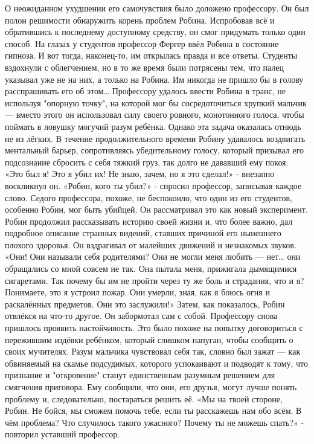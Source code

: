 \documentclass[a4paper,12pt]{book}
\begin{document}
	О неожиданном ухудшении его самочувствия было доложено профессору. Он был полон решимости обнаружить корень проблем Робина. Испробовав всё и обратившись к последнему доступному средству, он смог придумать только один способ. На глазах у студентов профессор Фергер ввёл Робина в состояние гипноза. И вот тогда, наконец-то, им открылась правда и все ответы.
	Студенты вздохнули с облегчением, но в то же время были потрясены тем, что палец указывал уже не на них, а только на Робина. Им никогда не пришло бы в голову расспрашивать его об этом…
	Профессору удалось ввести Робина в транс, не используя "опорную точку", на которой мог бы сосредоточиться хрупкий мальчик — вместо этого он использовал силу своего ровного, монотонного голоса, чтобы поймать в ловушку могучий разум ребёнка.
	Однако эта задача оказалась отнюдь не из лёгких. В течение продолжительного времени Робину удавалось воздвигать ментальный барьер, сопротивляясь убедительному голосу, который призывал его подсознание сбросить с себя тяжкий груз, так долго не дававший ему покоя.
	«Это был я! Это я убил их! Не знаю, зачем, но я это сделал!» - внезапно воскликнул он.
	«Робин, кого ты убил?» - спросил профессор, записывая каждое слово.
	Седого профессора, похоже, не беспокоило, что один из его студентов, особенно Робин, мог быть убийцей. Он рассматривал это как новый эксперимент. Робин продолжил рассказывать историю своей жизни и, что более важно, дал подробное описание странных видений, ставших причиной его нынешнего плохого здоровья. Он вздрагивал от малейших движений и незнакомых звуков. 
	«Они! Они называли себя родителями? Они не могли меня любить — нет… они обращались со мной совсем не так. Она пытала меня, прижигала дымящимися сигаретами. Так почему бы им не пройти через ту же боль и страдания, что и я? Понимаете, это я устроил пожар. Они умерли, зная, как я боюсь огня и раскалённых предметов. Они это заслужили!»
	Затем, как показалось, Робин отвлёкся на что-то другое. Он забормотал сам с собой.
	Профессору снова пришлось проявить настойчивость. Это было похоже на попытку договориться с пережившим издёвки ребёнком, который слишком напуган, чтобы сообщить о своих мучителях. Разум мальчика чувствовал себя так, словно был зажат — как обвиняемый на скамье подсудимых, которого успокаивают и подводят к тому, что признание и "откровение" станут единственным разумным решением для смягчения приговора.
	Ему сообщили, что они, его друзья, могут лучше понять проблему и, следовательно, постараться решить её.
	«Мы на твоей стороне, Робин. Не бойся, мы сможем помочь тебе, если ты расскажешь нам обо всём. В чём проблема? Что случилось такого ужасного? Почему ты не можешь спать?» - повторил уставший профессор.
\end{document}
